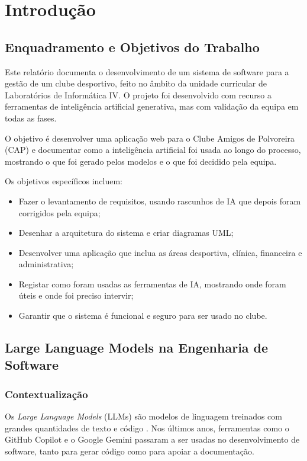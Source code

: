 \chapter{Introdução}

\section{Enquadramento e Objetivos do Trabalho}

Este relatório documenta o desenvolvimento de um sistema de software para a gestão de um clube desportivo, feito no âmbito da unidade curricular de Laboratórios de Informática IV. O projeto foi desenvolvido com recurso a ferramentas de inteligência artificial generativa, mas com validação da equipa em todas as fases.

O objetivo é desenvolver uma aplicação web para o Clube Amigos de Polvoreira (CAP) e documentar como a inteligência artificial foi usada ao longo do processo, mostrando o que foi gerado pelos modelos e o que foi decidido pela equipa.

Os objetivos específicos incluem:
\begin{itemize}
    \item Fazer o levantamento de requisitos, usando rascunhos de IA que depois foram corrigidos pela equipa;
    \item Desenhar a arquitetura do sistema e criar diagramas UML;
    \item Desenvolver uma aplicação que inclua as áreas desportiva, clínica, financeira e administrativa;
    \item Registar como foram usadas as ferramentas de IA, mostrando onde foram úteis e onde foi preciso intervir;
    \item Garantir que o sistema é funcional e seguro para ser usado no clube.
\end{itemize}

\section{Large Language Models na Engenharia de Software}

\subsection{Contextualização}

Os \textit{Large Language Models} (LLMs) são modelos de linguagem treinados com grandes quantidades de texto e código \cite{vaswani2017}. Nos últimos anos, ferramentas como o GitHub Copilot e o Google Gemini passaram a ser usadas no desenvolvimento de software, tanto para gerar código como para apoiar a documentação.

